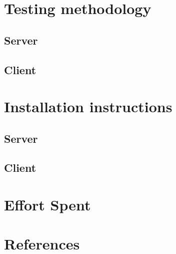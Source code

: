 \chapter{Testing methodology}
	\section{Server}
		
	\section{Client}
\newpage
\chapter{Installation instructions}
	\section{Server}
		
	\section{Client}
\newpage
\chapter{Effort Spent}
    
\chapter{References}
	


